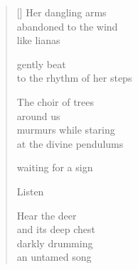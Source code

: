 \documentclass[12pt,a4paper]{article}
\begin{document}
\thispagestyle{empty}

\poemtitle{}

\settowidth{\versewidth}{to the rhythm of her steps}

\bigskip

\begin{verse}[\versewidth]
  Her dangling arms \\
  abandoned to the wind \\
  like lianas

  gently beat \\
  to the rhythm of her steps

  The choir of trees \\
  around us \\
  murmurs while staring \\
  at the divine pendulums

  waiting for a sign

  Listen

  Hear the deer \\
  and its deep chest \\
  darkly drumming \\
  an untamed song
  \end{verse}
\end{document}
